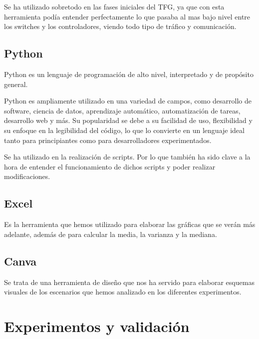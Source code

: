 \documentclass[a4paper, 12pt]{book}
\begin{document}
	Se ha utilizado sobretodo en las fases iniciales del TFG, ya que con esta herramienta podía entender perfectamente lo que pasaba al mas bajo nivel entre los switches y los controladores, viendo todo tipo de tráfico y comunicación.	
	
	\section{Python} 
	\label{sec:python}
	
	Python es un lenguaje de programación de alto nivel, interpretado y de propósito general. 
	
	Python es ampliamente utilizado en una variedad de campos, como desarrollo de software, ciencia de datos, aprendizaje automático, automatización de tareas, desarrollo web y más. Su popularidad se debe a su facilidad de uso, flexibilidad y su enfoque en la legibilidad del código, lo que lo convierte en un lenguaje ideal tanto para principiantes como para desarrolladores experimentados.
	
	Se ha utilizado en la realización de scripts. Por lo que también ha sido clave a la hora de entender el funcionamiento de dichos scripts y poder realizar modificaciones.
	
	\section{Excel} 
	\label{sec:python}
	
	Es la herramienta que hemos utilizado para elaborar las gráficas que se verán más adelante, además de para calcular la media, la varianza y la mediana.
	
	
	\section{Canva} 
	\label{sec:python}
	
	Se trata de una herramienta de diseño que nos ha servido para elaborar esquemas visuales de los escenarios que hemos analizado en los diferentes experimentos.
	
	
	\cleardoublepage
	\chapter{Experimentos y validación}
	\label{chap:experimentos}
	
\end{document}
